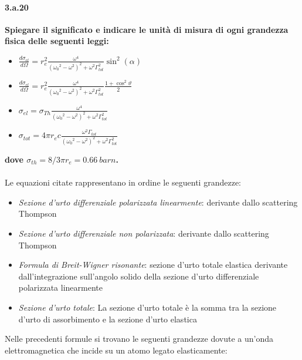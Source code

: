 \documentclass[twoside]{article}
\begin{document}
\paragraph{3.a.20}\textbf{Spiegare il significato e indicare le unità di misura di ogni grandezza fisica delle seguenti leggi:}
\begin{itemize}
    \item {\large$\frac{d\sigma_{el}}{d\Omega}=r_e^2\frac{\omega^4}{({\omega_0}^2-\omega^2)^2+\omega^2\Gamma^2_{tot}}\sin^2(\alpha)$}\\
    \item {\large$\frac{d\sigma_{el}}{d\Omega}=r_e^2\frac{\omega^4}{({\omega_0}^2-\omega^2)^2+\omega^2\Gamma^2_{tot}}\frac{1+\cos^2\vartheta}{2}$}\\
    \item {\large$\sigma_{el}=\sigma_{Th}\frac{\omega^4}{({\omega_0}^2-\omega^2)^2+\omega^2\Gamma^2_{tot}}$}\\
    \item {\large$\sigma_{tot}=4\pi r_ec\frac{\omega^2\Gamma_{tot}}{({\omega_0}^2-\omega^2)^2+\omega^2\Gamma^2_{tot}}$}
\end{itemize}
\textbf{dove $\sigma_{th}=8/3\pi r_e=0.66\ barn$.}\\
\\
Le equazioni citate rappresentano in ordine le seguenti grandezze:
\begin{itemize}
    \item \textit{Sezione d'urto differenziale polarizzata linearmente}: derivante dallo scattering Thompson
    \item \textit{Sezione d'urto differenziale non polarizzata}: derivante dallo scattering Thompson
    \item \textit{Formula di Breit-Wigner risonante}: sezione d'urto totale elastica derivante dall'integrazione sull'angolo solido della sezione d'urto differenziale polarizzata linearmente
    \item \textit{Sezione d'urto totale}: La sezione d'urto totale è la somma tra la sezione d'urto di assorbimento e la sezione d'urto elastica
\end{itemize}
Nelle precedenti formule si trovano le seguenti grandezze dovute a un'onda elettromagnetica che incide su un atomo legato elasticamente:
\end{document}
